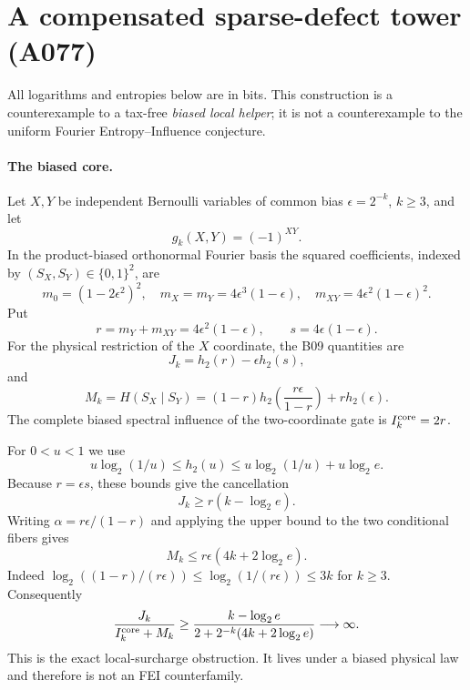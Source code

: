 \section*{A compensated sparse-defect tower (A077)}

All logarithms and entropies below are in bits.  This construction is a
counterexample to a tax-free \emph{biased local helper}; it is not a
counterexample to the uniform Fourier Entropy--Influence conjecture.

\paragraph{The biased core.}
Let $X,Y$ be independent Bernoulli variables of common bias
$\epsilon=2^{-k}$, $k\ge3$, and let
\[
 g_k(X,Y)=(-1)^{XY}.
\]
In the product-biased orthonormal Fourier basis the squared coefficients,
indexed by $(S_X,S_Y)\in\{0,1\}^2$, are
\[
 m_0=(1-2\epsilon^2)^2,
 \quad m_X=m_Y=4\epsilon^3(1-\epsilon),
 \quad m_{XY}=4\epsilon^2(1-\epsilon)^2.
\]
Put
\[
 r=m_Y+m_{XY}=4\epsilon^2(1-\epsilon),\qquad
 s=4\epsilon(1-\epsilon).
\]
For the physical restriction of the $X$ coordinate, the B09 quantities are
\[
 J_k=h_2(r)-\epsilon h_2(s),
\]
and
\[
 M_k=H(S_X\mid S_Y)
 =(1-r)h_2\!\left(\frac{r\epsilon}{1-r}\right)+r h_2(\epsilon).
\]
The complete biased spectral influence of the two-coordinate gate is
$I_k^{\rm core}=2r$.

For $0<u<1$ we use
\[
 u\log_2(1/u)\le h_2(u)
 \le u\log_2(1/u)+u\log_2 e.
\]
Because $r=\epsilon s$, these bounds give the cancellation
\[
 J_k\ge r(k-\log_2e).
\]
Writing $\alpha=r\epsilon/(1-r)$ and applying the upper bound to the two
conditional fibers gives
\[
 M_k\le r\epsilon(4k+2\log_2e).
\]
Indeed
$\log_2((1-r)/(r\epsilon))\le\log_2(1/(r\epsilon))\le3k$
for $k\ge3$.  Consequently
\[
 \frac{J_k}{I_k^{\rm core}+M_k}
 \ge
 \frac{k-\log_2e}{2+2^{-k}(4k+2\log_2e)}\longrightarrow\infty.
\]
This is the exact local-surcharge obstruction.  It lives under a biased
physical law and therefore is not an FEI counterfamily.

